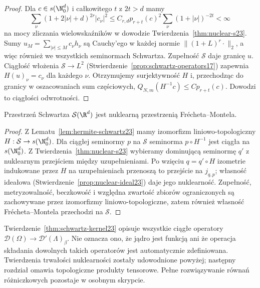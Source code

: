 \begin{proof}
Dla $c\in s(\N_0^d)$ i całkowitego $t$ z $2t>d$ mamy
\[
 \sum_\nu(1+2|\nu|+d)^{2r}|c_\nu|^2
 \le C_{r,d}p_{r+t}(c)^2
 \sum_\nu(1+|\nu|)^{-2t}<\infty
\]
na mocy zliczania wielowskaźników w dowodzie
Twierdzenia~\ref{thm:nuclear-s23}.
Sumy $u_M=\sum_{|\nu|\le M}c_\nu h_\nu$ są Cauchy'ego
w każdej normie $\|(1+L)^r\cdot\|_2$, a więc również
we wszystkich seminormach Schwartza. Zupełność
$\mathcal S$ daje granicę $u$. Ciągłość włożenia
$\mathcal S\to L^2$ (Stwierdzenie~\ref{prop:schwartz-operators17})
zapewnia $H(u)_\nu=c_\nu$ dla każdego $\nu$.
Otrzymujemy surjektywność $H$ i, przechodząc do granicy
w oszacowaniach sum częściowych,
$Q_{N,m}(H^{-1}c)\le C p_{r+t}(c)$.
Dowodzi to ciągłości odwrotności.
\end{proof}

\begin{wniosek}
\label{cor:nuclear-schwartz23}
Przestrzeń Schwartza $\mathcal S(\R^d)$ jest nuklearną
przestrzenią Frécheta--Montela.
\end{wniosek}
\begin{proof}
Z Lematu~\ref{lem:hermite-schwartz23} mamy izomorfizm
liniowo-topologiczny $H:\mathcal S\to s(\N_0^d)$.
Dla ciągłej seminormy $p$ na $\mathcal S$ seminorma
$p\circ H^{-1}$ jest ciągła na $s(\N_0^d)$.
Z Twierdzenia~\ref{thm:nuclear-s23} wybieramy dominującą
seminormę $q'$ z nuklearnym przejściem między
uzupełnieniami. Po wzięciu $q=q'\circ H$ izometrie
indukowane przez $H$ na uzupełnieniach przenoszą
to przejście na $j_{q,p}$; własność ideałowa
(Stwierdzenie~\ref{prop:nuclear-ideal23}) daje jego
nuklearność. Zupełność, metryzowalność, beczkowość
i względna zwartość zbiorów ograniczonych są zachowywane
przez izomorfizmy liniowo-topologiczne, zatem również
własność Frécheta--Montela przechodzi na $\mathcal S$.
\end{proof}

\begin{uwaga}
\label{rem:kernel-scope23}
Twierdzenie~\ref{thm:schwartz-kernel23} opisuje wszystkie
ciągłe operatory $\mathcal D(\Omega)\to\mathcal D'(\Lambda)_\beta$.
Nie oznacza ono, że jądro jest funkcją ani że operacja
składania dowolnych takich operatorów jest automatycznie
zdefiniowana. Twierdzenia trwałości nuklearności zostały udowodnione
powyżej; następny rozdział omawia topologiczne produkty tensorowe. Pełne rozwiązywanie równań
różniczkowych pozostaje w osobnym skrypcie.
\end{uwaga}
